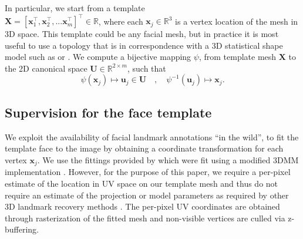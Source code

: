 In particular, we start from a template \\
$\bm{X} = [\bm{x}_1^\top ,\bm{x}_2^\top,...\bm{x}_m^\top]^\top \in \mathbb{R}$, where each $\bm{x}_j \in \mathbb{R}^3$ is a vertex location of the mesh in 3D space. 
%
This template could be any facial mesh, but in practice it is most useful to use a topology that is in correspondence with a 3D statistical shape model such as \cite{booth3d2} or \cite{paysan20093d}.
%
We compute a bijective mapping $\psi$, from template mesh $\bm{X}$ to the 2D canonical space $\bm{U} \in \mathbb{R}^{2\times m}$, such that  
%
\begin{equation}
\psi(\bm{x}_j) \mapsto \bm{u}_j \in \bm{U}  \quad  ,  \quad  \psi^{-1}(\bm{u}_j) \mapsto \bm{x}_j .
\end{equation} 
%

\subsection{Supervision for the face template}

We exploit the availability of facial landmark annotations ``in the wild'', to fit the template face to the image by obtaining a coordinate transformation for each vertex $\bm{x}_j$. 
We use the fittings provided by \cite{zhu2016face} which were fit using a modified 3DMM implementation \cite{romdhani2005estimating}. However, for the purpose of this paper, we require a per-pixel estimate of the location in UV space on our template mesh and thus do not require an estimate of the projection or model parameters as required by other 3D landmark recovery methods \cite{jourabloo2016large,zhu2016face}. The per-pixel UV coordinates are obtained through rasterization of the fitted mesh and non-visible vertices are culled via z-buffering.

